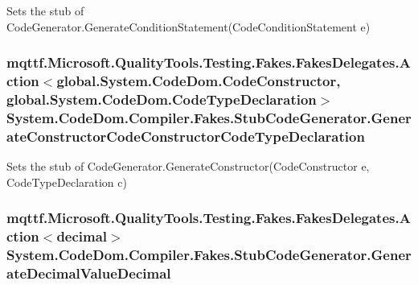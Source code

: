 Sets the stub of Code\-Generator.\-Generate\-Condition\-Statement(\-Code\-Condition\-Statement e)

\hypertarget{class_system_1_1_code_dom_1_1_compiler_1_1_fakes_1_1_stub_code_generator_a715fd83515da5c40b908663a4ccf8beb}{
\subsubsection[{Generate\-Constructor\-Code\-Constructor\-Code\-Type\-Declaration}]{\setlength{\rightskip}{0pt plus 5cm}mqttf.\-Microsoft.\-Quality\-Tools.\-Testing.\-Fakes.\-Fakes\-Delegates.\-Action$<$global.\-System.\-Code\-Dom.\-Code\-Constructor, global.\-System.\-Code\-Dom.\-Code\-Type\-Declaration$>$ System.\-Code\-Dom.\-Compiler.\-Fakes.\-Stub\-Code\-Generator.\-Generate\-Constructor\-Code\-Constructor\-Code\-Type\-Declaration}}\label{class_system_1_1_code_dom_1_1_compiler_1_1_fakes_1_1_stub_code_generator_a715fd83515da5c40b908663a4ccf8beb}


Sets the stub of Code\-Generator.\-Generate\-Constructor(\-Code\-Constructor e, Code\-Type\-Declaration c)

\hypertarget{class_system_1_1_code_dom_1_1_compiler_1_1_fakes_1_1_stub_code_generator_af2bd46ab8b793ed46a826ec1f6c71a69}{
\subsubsection[{Generate\-Decimal\-Value\-Decimal}]{\setlength{\rightskip}{0pt plus 5cm}mqttf.\-Microsoft.\-Quality\-Tools.\-Testing.\-Fakes.\-Fakes\-Delegates.\-Action$<$decimal$>$ System.\-Code\-Dom.\-Compiler.\-Fakes.\-Stub\-Code\-Generator.\-Generate\-Decimal\-Value\-Decimal}}\label{class_system_1_1_code_dom_1_1_compiler_1_1_fakes_1_1_stub_code_generator_af2bd46ab8b793ed46a826ec1f6c71a69}


